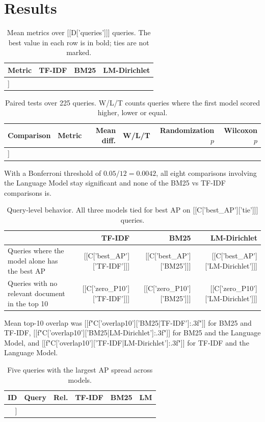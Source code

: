 \section{Results}
\begin{table}[H]\small\centering\caption{Mean metrics over [[D['queries']]] queries. The best value in each row is in bold; ties are not marked.}
\begin{tabular}{@{}lrrr@{}}\toprule
Metric & TF-IDF & BM25 & LM-Dirichlet \\\midrule
[[t_c()]]
\bottomrule\end{tabular}\end{table}
\begin{table}[H]\small\centering\caption{Paired tests over 225 queries. W/L/T counts queries where the first model scored higher, lower or equal.}
\begin{tabular}{@{}llrrrr@{}}\toprule
Comparison & Metric & Mean diff. & W/L/T & Randomization $p$ & Wilcoxon $p$ \\\midrule
[[t_tests()]]
\bottomrule\end{tabular}\end{table}
With a Bonferroni threshold of $0.05/12=0.0042$, all eight comparisons involving the Language Model stay significant and none of the BM25 vs TF-IDF comparisons is.

\begin{table}[H]\small\centering\caption{Query-level behavior. All three models tied for best AP on [[C['best_AP']['tie']]] queries.}
\begin{tabular}{@{}lrrr@{}}\toprule
 & TF-IDF & BM25 & LM-Dirichlet \\\midrule
Queries where the model alone has the best AP & [[C['best_AP']['TF-IDF']]] & [[C['best_AP']['BM25']]] & [[C['best_AP']['LM-Dirichlet']]] \\
Queries with no relevant document in the top 10 & [[C['zero_P10']['TF-IDF']]] & [[C['zero_P10']['BM25']]] & [[C['zero_P10']['LM-Dirichlet']]] \\
\bottomrule\end{tabular}\end{table}
Mean top-10 overlap was [[f"{C['overlap10']['BM25|TF-IDF']:.3f}"]] for BM25 and TF-IDF, [[f"{C['overlap10']['BM25|LM-Dirichlet']:.3f}"]] for BM25 and the Language Model, and [[f"{C['overlap10']['TF-IDF|LM-Dirichlet']:.3f}"]] for TF-IDF and the Language Model.

\begin{table}[H]\small\centering\caption{Five queries with the largest AP spread across models.}
\begin{tabularx}{\linewidth}{@{}rYrrrr@{}}\toprule
ID & Query & Rel. & TF-IDF & BM25 & LM \\\midrule
[[t_ex()]]
\bottomrule\end{tabularx}\end{table}

